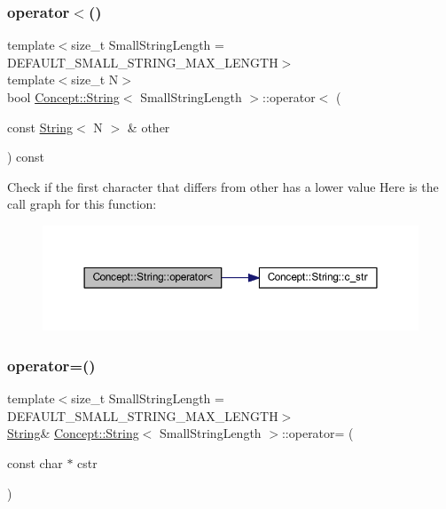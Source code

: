 \subsubsection{\texorpdfstring{operator$<$()}{operator<()}}
{\footnotesize\ttfamily template$<$size\+\_\+t Small\+String\+Length = D\+E\+F\+A\+U\+L\+T\+\_\+\+S\+M\+A\+L\+L\+\_\+\+S\+T\+R\+I\+N\+G\+\_\+\+M\+A\+X\+\_\+\+L\+E\+N\+G\+TH$>$ \\
template$<$size\+\_\+t N$>$ \\
bool \mbox{\hyperlink{class_concept_1_1_string}{Concept\+::\+String}}$<$ Small\+String\+Length $>$\+::operator$<$ (\begin{DoxyParamCaption}\item[{const \mbox{\hyperlink{class_concept_1_1_string}{String}}$<$ N $>$ \&}]{other }\end{DoxyParamCaption}) const\hspace{0.3cm}{\ttfamily [inline]}}

Check if the first character that differs from other has a lower value Here is the call graph for this function\+:\nopagebreak
\begin{figure}[H]
\begin{center}
\leavevmode
\includegraphics[width=350pt]{class_concept_1_1_string_a3289dc92f822852100885569f6a7bab9_cgraph}
\end{center}
\end{figure}
\mbox{\label{class_concept_1_1_string_a6d3cce47a7d0046d4d54d34c20f6a915}} 
\subsubsection{\texorpdfstring{operator=()}{operator=()}\hspace{0.1cm}{\footnotesize\ttfamily [1/3]}}
{\footnotesize\ttfamily template$<$size\+\_\+t Small\+String\+Length = D\+E\+F\+A\+U\+L\+T\+\_\+\+S\+M\+A\+L\+L\+\_\+\+S\+T\+R\+I\+N\+G\+\_\+\+M\+A\+X\+\_\+\+L\+E\+N\+G\+TH$>$ \\
\mbox{\hyperlink{class_concept_1_1_string}{String}}\& \mbox{\hyperlink{class_concept_1_1_string}{Concept\+::\+String}}$<$ Small\+String\+Length $>$\+::operator= (\begin{DoxyParamCaption}\item[{const char $\ast$}]{cstr }\end{DoxyParamCaption})\hspace{0.3cm}{\ttfamily [inline]}}

